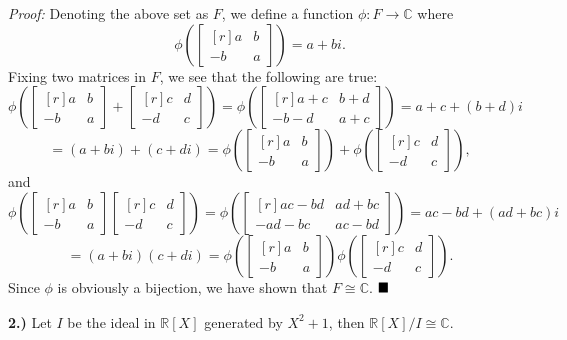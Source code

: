 \documentclass[12pt]{article}
\newcommand{\R}{\ensuremath{\mathbb{R}}}
\newcommand{\C}{\ensuremath{\mathbb{C}}}
\newcommand{\parenb}[1]{\left(#1\right)}
\newcommand{\proof}{\textit{Proof: }}
\newcommand{\done}{\ensuremath{\strut\hfill\blacksquare}}
\begin{document}
\proof
Denoting the above set as \( F \), we define a function \( \phi : F \to \C \)
where
\[
	\phi\parenb{
		\begin{bmatrix*}[r]
			a & b \\ -b & a
		\end{bmatrix*}
	} = a + bi.
\]
Fixing two matrices in \( F \), we see that the following are true:
\[
	\phi\parenb{
		\begin{bmatrix*}[r]
			a & b \\ -b & a
		\end{bmatrix*}
		+
		\begin{bmatrix*}[r]
			c & d \\ -d & c
		\end{bmatrix*}
	}
	= \phi\parenb{
		\begin{bmatrix*}[r]
			a + c & b + d \\ -b - d & a + c
		\end{bmatrix*}
	}
	= a + c + (b + d)i
\]
\[
	= (a + bi) + (c + di)
	= \phi\parenb{
		\begin{bmatrix*}[r]
			a & b \\ -b & a
		\end{bmatrix*}
	}
	+ \phi\parenb{
		\begin{bmatrix*}[r]
			c & d \\ -d & c
		\end{bmatrix*}
	},
\]
and
\[
	\phi\parenb{
		\begin{bmatrix*}[r]
			a & b \\ -b & a
		\end{bmatrix*}
		\begin{bmatrix*}[r]
			c & d \\ -d & c
		\end{bmatrix*}
	}
	= \phi\parenb{
		\begin{bmatrix*}[r]
			ac - bd & ad + bc \\ -ad - bc & ac - bd
		\end{bmatrix*}
	}
	= ac - bd + (ad + bc)i
\]
\[
	= (a + bi)(c + di)
	= \phi\parenb{
		\begin{bmatrix*}[r]
			a & b \\ -b & a
		\end{bmatrix*}
	}
	\phi\parenb{
		\begin{bmatrix*}[r]
			c & d \\ -d & c
		\end{bmatrix*}
	}.
\]
Since \( \phi \) is obviously a bijection, we have shown that \( F \cong \C \).
\done

\textbf{2.)}
Let \( I \) be the ideal in \( \R[X] \) generated by \( X^2 + 1 \), then
\( \R[X]/I \cong \C \).
\end{document}
